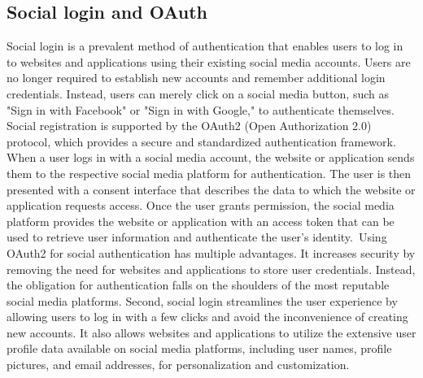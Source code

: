 \documentclass[../Main.tex]{subfiles}
\begin{document}
\subsection{Social login and OAuth}
Social login is a prevalent method of authentication that enables users to log in to websites and applications using their existing social media accounts. Users are no longer required to establish new accounts and remember additional login credentials. Instead, users can merely click on a social media button, such as "Sign in with Facebook" or "Sign in with Google," to authenticate themselves. Social registration is supported by the OAuth2 (Open Authorization 2.0) \cite{oauth2} protocol, which provides a secure and standardized authentication framework. When a user logs in with a social media account, the website or application sends them to the respective social media platform for authentication. The user is then presented with a consent interface that describes the data to which the website or application requests access. Once the user grants permission, the social media platform provides the website or application with an access token that can be used to retrieve user information and authenticate the user's identity. Using OAuth2 for social authentication has multiple advantages. It increases security by removing the need for websites and applications to store user credentials. Instead, the obligation for authentication falls on the shoulders of the most reputable social media platforms. Second, social login streamlines the user experience by allowing users to log in with a few clicks and avoid the inconvenience of creating new accounts. It also allows websites and applications to utilize the extensive user profile data available on social media platforms, including user names, profile pictures, and email addresses, for personalization and customization.
\end{document}
